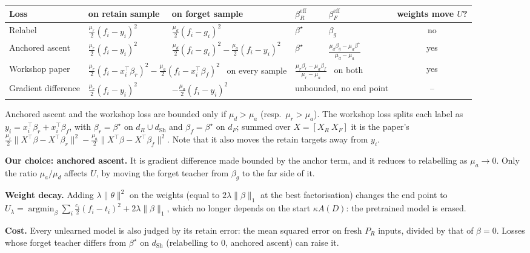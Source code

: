 \documentclass[10pt]{article}
\newcommand{\dSh}{d_{\mathrm{Sh}}}
\begin{document}
\begin{center}\small\setlength{\tabcolsep}{5pt}\renewcommand{\arraystretch}{1.6}
\begin{tabular}{@{}lllllc@{}}
\toprule
Loss & on retain sample & on forget sample & $\beta^{\mathrm{eff}}_R$ & $\beta^{\mathrm{eff}}_F$ & weights move $U$?\\
\midrule
Relabel & $\frac{\mu_r}{2}(f_i-y_i)^2$ & $\frac{\mu_d}{2}(f_i-g_i)^2$ & $\beta^\star$ & $\beta_g$ & no\\
Anchored ascent & $\frac{\mu_r}{2}(f_i-y_i)^2$ & $\frac{\mu_d}{2}(f_i-g_i)^2-\frac{\mu_a}{2}(f_i-y_i)^2$ & $\beta^\star$ & $\frac{\mu_d\beta_g-\mu_a\beta^\star}{\mu_d-\mu_a}$ & yes\\
Workshop paper & \multicolumn{2}{l}{$\frac{\mu_r}{2}(f_i-x_i^\top\beta_r)^2-\frac{\mu_a}{2}(f_i-x_i^\top\beta_f)^2$ \ on every sample} & \multicolumn{2}{l}{$\frac{\mu_r\beta_r-\mu_a\beta_f}{\mu_r-\mu_a}$ \ on both} & yes\\
Gradient difference & $\frac{\mu_r}{2}(f_i-y_i)^2$ & $-\frac{\mu_a}{2}(f_i-y_i)^2$ & \multicolumn{2}{l}{unbounded, no end point} & --\\
\bottomrule
\end{tabular}
\end{center}

\vspace{-2pt}
Anchored ascent and the workshop loss are bounded only if $\mu_d>\mu_a$ (resp.\ $\mu_r>\mu_a$). The workshop loss splits each label as $y_i=x_i^\top\beta_r+x_i^\top\beta_f$, with $\beta_r=\beta^\star$ on $d_R\cup\dSh$ and $\beta_f=\beta^\star$ on $d_F$; summed over $X=[X_R\ X_F]$ it is the paper's $\frac{\mu_r}{2}\|X^\top\beta-X^\top\beta_r\|^2-\frac{\mu_a}{2}\|X^\top\beta-X^\top\beta_f\|^2$. Note that it also moves the retain targets away from $y_i$.

\textbf{Our choice: anchored ascent.} It is gradient difference made bounded by the anchor term, and it reduces to relabelling as $\mu_a\to0$. Only the ratio $\mu_a/\mu_d$ affects $U$, by moving the forget teacher from $\beta_g$ to the far side of it.

\textbf{Weight decay.} Adding $\lambda\|\theta\|^2$ on the weights (equal to $2\lambda\|\beta\|_1$ at the best factorisation) changes the end point to
$U_\lambda=\operatorname*{argmin}_\beta \sum_i\frac{c_i}{2}(f_i-t_i)^2+2\lambda\|\beta\|_1$, which no longer depends on the start $\kappa A(D)$: the pretrained model is erased.

\textbf{Cost.} Every unlearned model is also judged by its retain error: the mean squared error on fresh $P_R$ inputs, divided by that of $\beta=0$. Losses whose forget teacher differs from $\beta^\star$ on $\dSh$ (relabelling to $0$, anchored ascent) can raise it.
\end{document}
